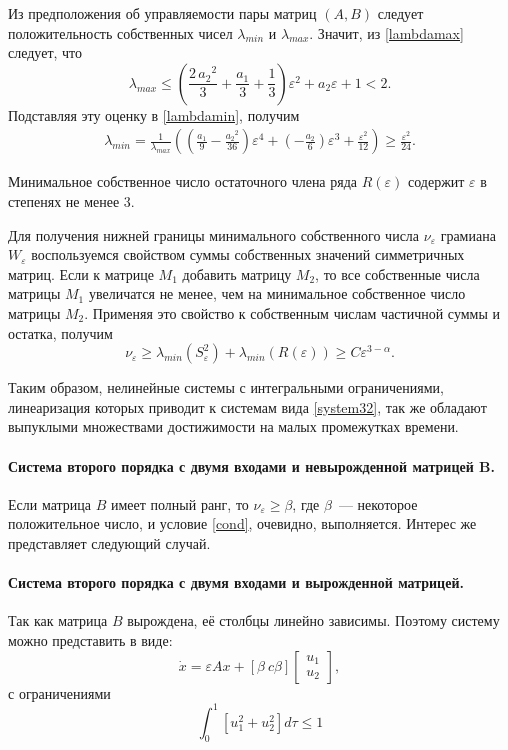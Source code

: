 \documentclass[../main.tex]{subfiles}
\begin{document}
 Из предположения об управляемости пары матриц $ (A,B) $ следует положительность собственных чисел $ \lambda_{min} $ и $ \lambda_{max} $. Значит, из \eqref{lambdamax} следует, что
 \begin{equation*}
	 \lambda_{max} \leq \left(\frac{2\,{a_{2}}^2}{3}+\frac{a_{1}}{3}+\frac{1}{3}\right)\varepsilon^2+a_{2}\varepsilon+1 < 2.
 \end{equation*}
 Подставляя эту оценку в \eqref{lambdamin}, получим
 \begin{gather*}
	 \lambda_{min} = \frac{1}{\lambda_{max}}\left(  \left(\frac{a_{1}}{9}-\frac{{a_{2}}^2}{36}\right)\varepsilon^4+\left(-\frac{a_{2}}{6}\right)\varepsilon^3+\frac{\varepsilon^2}{12}\right) \geq \frac{\varepsilon^2}{24}.
 \end{gather*}
 
 Минимальное собственное число остаточного члена ряда $ R(\varepsilon) $ содержит $ \varepsilon $ в степенях не менее 3.
 
 Для получения нижней границы минимального собственного числа $ \nu_{\varepsilon} $ грамиана $ W_{\varepsilon}$ воспользуемся свойством суммы собственных значений симметричных матриц\cite{Wilkinson}. Если к матрице $ M_1 $ добавить матрицу $ M_2 $, то все собственные числа матрицы $ M_1 $ увеличатся не менее, чем на минимальное собственное число матрицы $ M_2 $. Применяя это свойство к собственным числам частичной суммы и остатка, получим
 \begin{equation}
	 \nu_{\varepsilon} \geq \lambda_{min}(S_{\varepsilon}^{2}) + \lambda_{min}(R(\varepsilon)) \geq C \varepsilon^{3-\alpha}.
 \end{equation}
 
 Таким образом, нелинейные системы с интегральными ограничениями, линеаризация которых приводит к системам вида \eqref{system32},  так же обладают выпуклыми множествами достижимости на малых промежутках времени.
 \paragraph{Система второго порядка с двумя входами и невырожденной матрицей B.}
 Если матрица $ B $ имеет полный ранг, то $\nu_{\varepsilon} \geq \beta $, где $ \beta $~--- некоторое положительное число, и условие \eqref{cond}, очевидно, выполняется. Интерес же представляет следующий случай.
 \paragraph{Система второго порядка с двумя входами и вырожденной матрицей.}
 Так как матрица $  B $ вырождена, её столбцы линейно зависимы. Поэтому систему можно представить в виде:
 \begin{equation}\label{system4}
	 \dot{x} = \varepsilon A x + \left[ \beta \ c\beta \right]  {\left[ {\begin{array}{*{20}{c}}
				 {{u_1}}\\
				 {{u_2}}
		 \end{array}} \right]}, 
 \end{equation}
 с ограничениями 
 \begin{equation}\label{contrainsts1}
	 \int_{0}^{1} \left[ u_1^2 + u_2^2 \right] d \tau \leq 1
 \end{equation}
 
\end{document}
